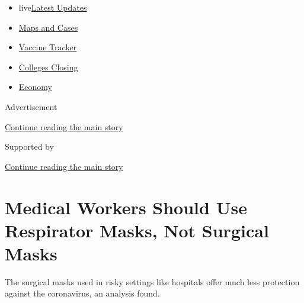 \begin{itemize}
\tightlist
\item
  live\href{https://www.nytimes3xbfgragh.onion/2020/08/21/world/covid-19-coronavirus.html?name=styln-coronavirus-national\&region=TOP_BANNER\&variant=undefined\&block=storyline_menu_recirc\&action=click\&pgtype=Article\&impression_id=4aab1751-e3af-11ea-aa1e-5137522d6522}{Latest
  Updates}
\item
  \href{https://www.nytimes3xbfgragh.onion/interactive/2020/us/coronavirus-us-cases.html?name=styln-coronavirus-national\&region=TOP_BANNER\&variant=undefined\&block=storyline_menu_recirc\&action=click\&pgtype=Article\&impression_id=4aab1752-e3af-11ea-aa1e-5137522d6522}{Maps
  and Cases}
\item
  \href{https://www.nytimes3xbfgragh.onion/interactive/2020/science/coronavirus-vaccine-tracker.html?name=styln-coronavirus-national\&region=TOP_BANNER\&variant=undefined\&block=storyline_menu_recirc\&action=click\&pgtype=Article\&impression_id=4aab1753-e3af-11ea-aa1e-5137522d6522}{Vaccine
  Tracker}
\item
  \href{https://www.nytimes3xbfgragh.onion/2020/08/19/us/colleges-closing-covid.html?name=styln-coronavirus-national\&region=TOP_BANNER\&variant=undefined\&block=storyline_menu_recirc\&action=click\&pgtype=Article\&impression_id=4aab1754-e3af-11ea-aa1e-5137522d6522}{Colleges
  Closing}
\item
  \href{https://www.nytimes3xbfgragh.onion/live/2020/08/21/business/stock-market-today-coronavirus?name=styln-coronavirus-national\&region=TOP_BANNER\&variant=undefined\&block=storyline_menu_recirc\&action=click\&pgtype=Article\&impression_id=4aab1755-e3af-11ea-aa1e-5137522d6522}{Economy}
\end{itemize}

Advertisement

\protect\hyperlink{after-top}{Continue reading the main story}

Supported by

\protect\hyperlink{after-sponsor}{Continue reading the main story}

\hypertarget{medical-workers-should-use-respirator-masks-not-surgical-masks}{%
\section{Medical Workers Should Use Respirator Masks, Not Surgical
Masks}\label{medical-workers-should-use-respirator-masks-not-surgical-masks}}

The surgical masks used in risky settings like hospitals offer much less
protection against the coronavirus, an analysis found.

